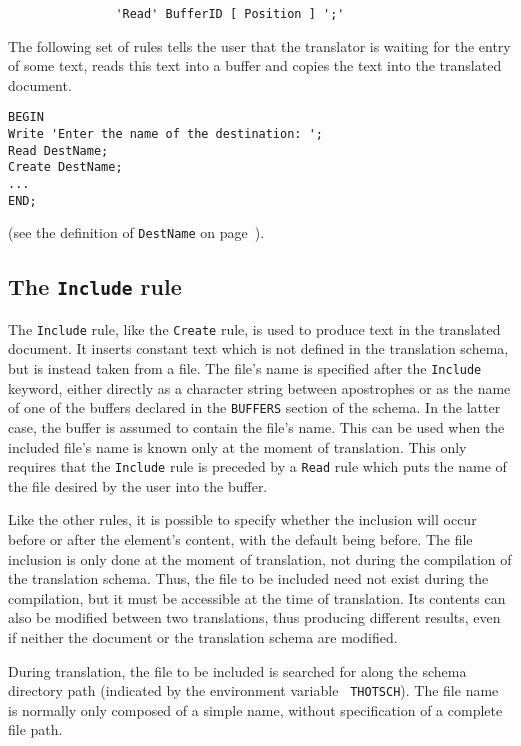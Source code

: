 \begin{verbatim}
               'Read' BufferID [ Position ] ';'
\end{verbatim}

\begin{example}
The following set of rules tells the user that the translator is
waiting for the entry of some text, reads this text into a buffer and
copies the text into the translated document.
\begin{verbatim}
BEGIN
Write 'Enter the name of the destination: ';
Read DestName;
Create DestName;
...
END;
\end{verbatim}
(see the definition of {\tt DestName} on page~\pageref{nomdest}).
\end{example}

\subsection{The {\tt Include} rule}

The {\tt Include} rule, like the {\tt Create} rule, is used to produce
text in the translated document.  It inserts constant text which is
not defined in the translation schema, but is instead taken from a
file.  The file's name  is specified after the {\tt Include} keyword,
either directly as a character string between apostrophes or as the
name of one of the buffers declared in the {\tt BUFFERS} section of
the schema.  In the latter case, the buffer is assumed to contain the
file's name.  This can be used when the included file's name is known only at
the moment of translation.  This only requires that the {\tt Include}
rule is preceded by a {\tt Read} rule which puts the name of the
file desired by the user into the buffer.

Like the other rules, it is possible to specify whether the inclusion
will occur before or after the element's content, with the default
being before.  The file inclusion is only done at the moment of
translation, not during the compilation of the translation schema.
Thus, the file to be included need not exist during the compilation,
but it must be accessible at the time of translation.  Its contents
can also be modified between two translations, thus producing
different results, even if neither the document or the translation
schema are modified.

During translation, the file to be included is searched for along the
schema directory path (indicated by the environment variable {\tt
THOTSCH}).  The file name is normally only composed of a simple name,
without specification of a complete file path.

